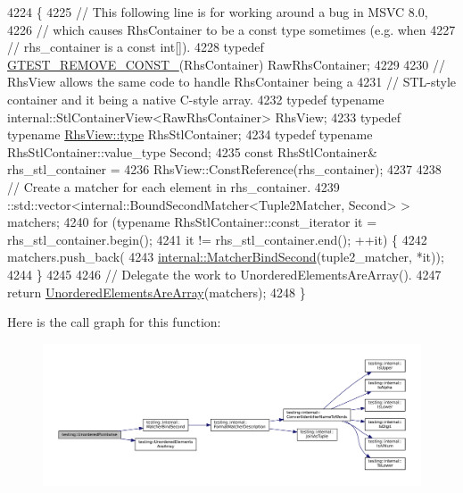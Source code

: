 \begin{DoxyCode}
4224                                                       \{
4225   \textcolor{comment}{// This following line is for working around a bug in MSVC 8.0,}
4226   \textcolor{comment}{// which causes RhsContainer to be a const type sometimes (e.g. when}
4227   \textcolor{comment}{// rhs\_container is a const int[]).}
4228   \textcolor{keyword}{typedef} \hyperlink{gtest-internal_8h_a2ffec8c60510eb130af387f5ce9a756a}{GTEST\_REMOVE\_CONST\_}(RhsContainer) RawRhsContainer;
4229 
4230   \textcolor{comment}{// RhsView allows the same code to handle RhsContainer being a}
4231   \textcolor{comment}{// STL-style container and it being a native C-style array.}
4232   \textcolor{keyword}{typedef} \textcolor{keyword}{typename} internal::StlContainerView<RawRhsContainer> RhsView;
4233   \textcolor{keyword}{typedef} \textcolor{keyword}{typename} \hyperlink{namespacegenerate__debs_a50bc9a7ecac9584553e089a448bcde58}{RhsView::type} RhsStlContainer;
4234   \textcolor{keyword}{typedef} \textcolor{keyword}{typename} RhsStlContainer::value\_type Second;
4235   \textcolor{keyword}{const} RhsStlContainer& rhs\_stl\_container =
4236       RhsView::ConstReference(rhs\_container);
4237 
4238   \textcolor{comment}{// Create a matcher for each element in rhs\_container.}
4239   ::std::vector<internal::BoundSecondMatcher<Tuple2Matcher, Second> > matchers;
4240   \textcolor{keywordflow}{for} (\textcolor{keyword}{typename} RhsStlContainer::const\_iterator it = rhs\_stl\_container.begin();
4241        it != rhs\_stl\_container.end(); ++it) \{
4242     matchers.push\_back(
4243         \hyperlink{namespacetesting_1_1internal_a31eb77a2bb0ca713d6ef07d8a3b9af9e}{internal::MatcherBindSecond}(tuple2\_matcher, *it));
4244   \}
4245 
4246   \textcolor{comment}{// Delegate the work to UnorderedElementsAreArray().}
4247   \textcolor{keywordflow}{return} \hyperlink{namespacetesting_a72b0ee2217293106fcf4971dc4a59f4c}{UnorderedElementsAreArray}(matchers);
4248 \}
\end{DoxyCode}
Here is the call graph for this function\+:
\nopagebreak
\begin{figure}[H]
\begin{center}
\leavevmode
\includegraphics[width=350pt]{namespacetesting_a3e800c56ae70a6d9955077a75d4971f1_cgraph}
\end{center}
\end{figure}
\mbox{\label{namespacetesting_a4c9bd414747bf0563bfdb32a2307dcdf}} 
